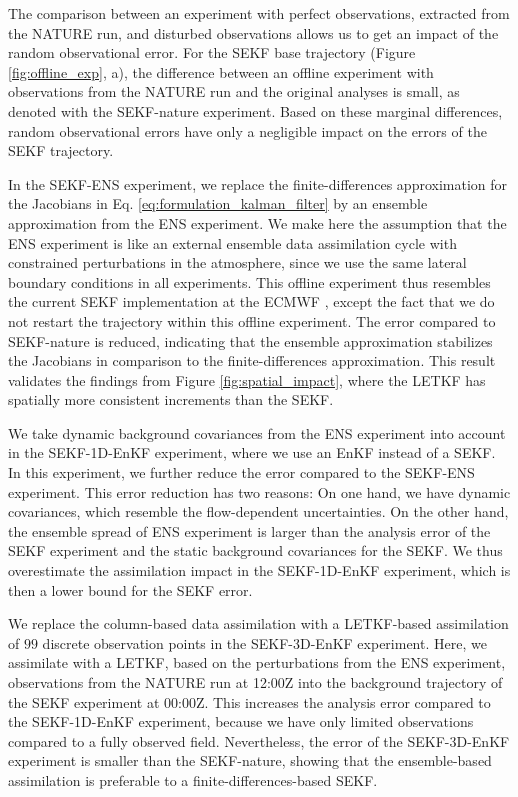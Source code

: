 \documentclass[hess, manuscript]{copernicus}
\begin{document}
The comparison between an experiment with perfect observations, extracted from the NATURE run, and disturbed observations allows us to get an impact of the random observational error.
For the SEKF base trajectory (Figure \ref{fig:offline_exp}, a), the difference between an offline experiment with observations from the NATURE run and the original analyses is small, as denoted with the SEKF-nature experiment.
Based on these marginal differences, random observational errors have only a negligible impact on the errors of the SEKF trajectory.

In the SEKF-ENS experiment, we replace the finite-differences approximation for the Jacobians in Eq. \eqref{eq:formulation_kalman_filter} by an ensemble approximation from the ENS experiment.
We make here the assumption that the ENS experiment is like an external ensemble data assimilation cycle with constrained perturbations in the atmosphere, since we use the same lateral boundary conditions in all experiments.
This offline experiment thus resembles the current SEKF implementation at the ECMWF \citep{ecmwf_ifs_2019}, except the fact that we do not restart the trajectory within this offline experiment.
The error compared to SEKF-nature is reduced, indicating that the ensemble approximation stabilizes the Jacobians in comparison to the finite-differences approximation.
This result validates the findings from Figure \ref{fig:spatial_impact}, where the LETKF has spatially more consistent increments than the SEKF.

We take dynamic background covariances from the ENS experiment into account in the SEKF-1D-EnKF experiment, where we use an EnKF instead of a SEKF.
In this experiment, we further reduce the error compared to the SEKF-ENS experiment.
This error reduction has two reasons:
On one hand, we have dynamic covariances, which resemble the flow-dependent uncertainties.
On the other hand, the ensemble spread of ENS experiment is larger than the analysis error of the SEKF experiment and the static background covariances for the SEKF.
We thus overestimate the assimilation impact in the SEKF-1D-EnKF experiment, which is then a lower bound for the SEKF error.

We replace the column-based data assimilation with a LETKF-based assimilation of $99$ discrete observation points in the SEKF-3D-EnKF experiment.
Here, we assimilate with a LETKF, based on the perturbations from the ENS experiment, observations from the NATURE run at 12:00Z into the background trajectory of the SEKF experiment at 00:00Z.
This increases the analysis error compared to the SEKF-1D-EnKF experiment, because we have only limited observations compared to a fully observed field.
Nevertheless, the error of the SEKF-3D-EnKF experiment is smaller than the SEKF-nature, showing that the ensemble-based assimilation is preferable to a finite-differences-based SEKF.
\end{document}
